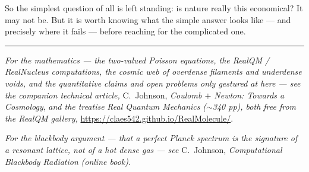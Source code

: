 \documentclass[11pt]{article}
\begin{document}
So the simplest question of all is left standing: is nature really this economical? It may not be. But it is worth
knowing what the simple answer looks like --- and precisely where it fails --- before reaching for the complicated
one.

\bigskip
\hrule
\medskip
\noindent\emph{For the mathematics --- the two-valued Poisson equations, the RealQM / RealNucleus computations, the
cosmic web of overdense filaments and underdense voids, and the quantitative claims and open problems only gestured
at here --- see the companion technical article,} C.\ Johnson, \emph{Coulomb $+$ Newton: Towards a Cosmology},
\emph{and the treatise} \emph{Real Quantum Mechanics} \emph{($\sim$340 pp), both free from
the RealQM gallery,} \url{https://claes542.github.io/RealMolecule/}.

\medskip
\noindent\emph{For the blackbody argument --- that a perfect Planck spectrum is the signature of a resonant lattice,
not of a hot dense gas --- see} C.\ Johnson, \emph{Computational Blackbody Radiation} \emph{(online book).}
\end{document}
